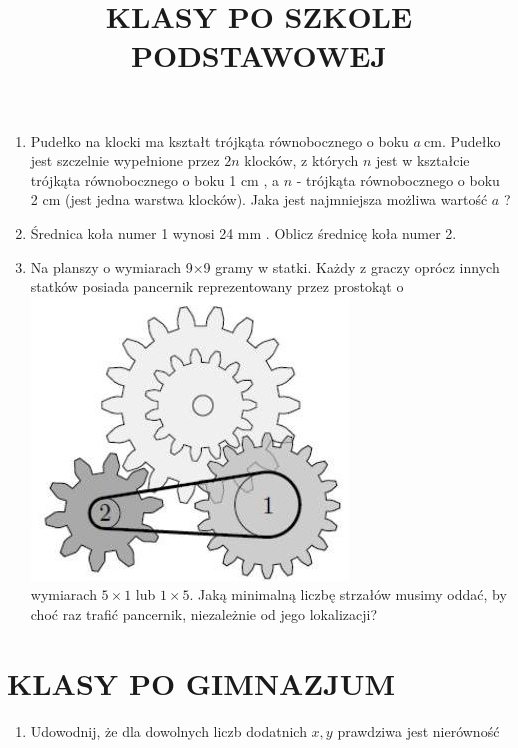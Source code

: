 \documentclass[10pt]{article}
\title{KLASY PO SZKOLE PODSTAWOWEJ }
\author{}
\date{}
\begin{document}
\maketitle
\begin{enumerate}
  \item Pudełko na klocki ma kształt trójkąta równobocznego o boku \(a \mathrm{~cm}\). Pudełko jest szczelnie wypełnione przez \(2 n\) klocków, z których \(n\) jest w kształcie trójkąta równobocznego o boku 1 cm , a \(n\) - trójkąta równobocznego o boku 2 cm (jest jedna warstwa klocków). Jaka jest najmniejsza możliwa wartość \(a\) ?
  \item Średnica koła numer 1 wynosi 24 mm . Oblicz średnicę koła numer 2.
  \item Na planszy o wymiarach 9×9 gramy w statki. Każdy z graczy oprócz innych statków posiada pancernik reprezentowany przez prostokąt o\\
\includegraphics[max width=\textwidth, center]{2024_11_21_8959f10a7e6dd43271bbg-1}\\
wymiarach \(5 \times 1\) lub \(1 \times 5\). Jaką minimalną liczbę strzałów musimy oddać, by choć raz trafić pancernik, niezależnie od jego lokalizacji?
\end{enumerate}

\section*{KLASY PO GIMNAZJUM}
\begin{enumerate}
  \item Udowodnij, że dla dowolnych liczb dodatnich \(x, y\) prawdziwa jest nierówność
\end{enumerate}
\end{document}
